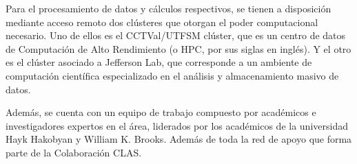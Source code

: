 Para el procesamiento de datos y cálculos respectivos, se tienen a disposición mediante acceso remoto dos clústeres que otorgan el poder computacional necesario. Uno de ellos es el CCTVal/UTFSM clúster, que es un centro de datos de Computación de Alto Rendimiento (o HPC, por sus siglas en inglés). Y el otro es el clúster asociado a Jefferson Lab, que corresponde a un ambiente de computación científica especializado en el análisis y almacenamiento masivo de datos.

Además, se cuenta con un equipo de trabajo compuesto por académicos e investigadores expertos en el área, liderados por los académicos de la universidad Hayk Hakobyan y William K. Brooks. Además de toda la red de apoyo que forma parte de la Colaboración CLAS.

